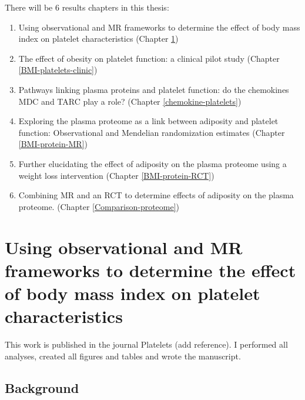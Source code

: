 \documentclass[11pt,twoside]{bristolthesis}
\providecommand{\tightlist}{%
  \setlength{\itemsep}{0pt}\setlength{\parskip}{0pt}}
\begin{document}
There will be 6 results chapters in this thesis:
\begin{enumerate}
\def\labelenumi{\arabic{enumi})}
\tightlist
\item
  Using observational and MR frameworks to determine the effect of body mass index on platelet characteristics (Chapter \ref{BMI-platelets-INTERVAL})
\item
  The effect of obesity on platelet function: a clinical pilot study (Chapter \ref{BMI-platelets-clinic})
\item
  Pathways linking plasma proteins and platelet function: do the chemokines MDC and TARC play a role? (Chapter \ref{chemokine-platelets})
\item
  Exploring the plasma proteome as a link between adiposity and platelet function: Observational and Mendelian randomization estimates (Chapter \ref{BMI-protein-MR})
\item
  Further elucidating the effect of adiposity on the plasma proteome using a weight loss intervention (Chapter \ref{BMI-protein-RCT})
\item
  Combining MR and an RCT to determine effects of adiposity on the plasma proteome. (Chapter \ref{Comparison-proteome})
\end{enumerate}
\hypertarget{BMI-platelets-INTERVAL}{%
\chapter{Using observational and MR frameworks to determine the effect of body mass index on platelet characteristics}\label{BMI-platelets-INTERVAL}}

This work is published in the journal Platelets (add reference). I performed all analyses, created all figures and tables and wrote the manuscript.

\hypertarget{background-1}{%
\section{Background}\label{background-1}}
\end{document}
